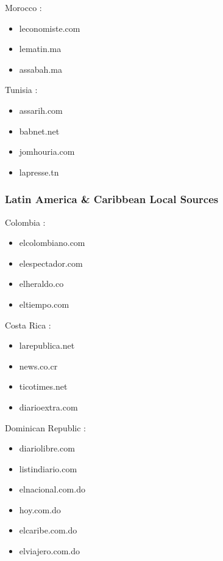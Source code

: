 \documentclass[
  letterpaper,
  DIV=11,
  numbers=noendperiod]{scrartcl}
\providecommand{\tightlist}{%
  \setlength{\itemsep}{0pt}\setlength{\parskip}{0pt}}\usepackage{longtable,booktabs,array}
\begin{document}
Morocco :

\begin{itemize}
\tightlist
\item
  leconomiste.com
\item
  lematin.ma
\item
  assabah.ma
\end{itemize}

Tunisia :

\begin{itemize}
\tightlist
\item
  assarih.com
\item
  babnet.net
\item
  jomhouria.com
\item
  lapresse.tn
\end{itemize}

\subsubsection{Latin America \& Caribbean Local
Sources}\label{latin-america-caribbean-local-sources}

Colombia :

\begin{itemize}
\tightlist
\item
  elcolombiano.com
\item
  elespectador.com
\item
  elheraldo.co
\item
  eltiempo.com
\end{itemize}

Costa Rica :

\begin{itemize}
\tightlist
\item
  larepublica.net
\item
  news.co.cr
\item
  ticotimes.net
\item
  diarioextra.com
\end{itemize}

Dominican Republic :

\begin{itemize}
\tightlist
\item
  diariolibre.com
\item
  listindiario.com
\item
  elnacional.com.do
\item
  hoy.com.do
\item
  elcaribe.com.do
\item
  elviajero.com.do
\end{itemize}
\end{document}
